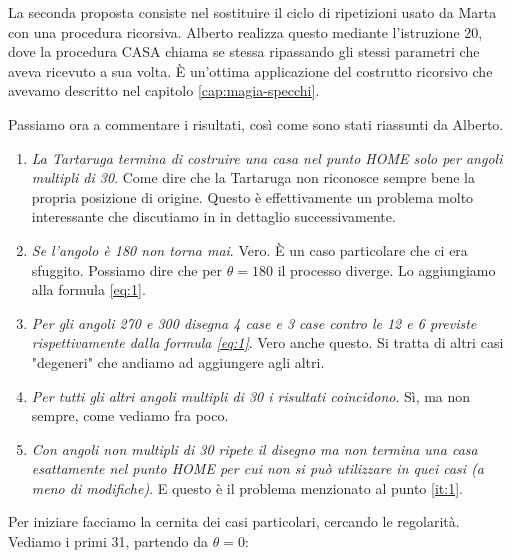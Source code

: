 La seconda proposta consiste nel sostituire il ciclo di ripetizioni usato da
Marta con una procedura ricorsiva. Alberto realizza questo mediante
l'istruzione 20, dove la procedura CASA chiama se stessa ripassando gli stessi
parametri che aveva ricevuto a sua volta. È un'ottima applicazione del
costrutto ricorsivo che avevamo descritto nel capitolo \ref{cap:magia-specchi}.

Passiamo ora a commentare i risultati, così come sono stati riassunti da Alberto.

\begin{enumerate}
	\item \label{it:1} \textit{La Tartaruga termina di costruire una casa nel punto HOME solo
		per angoli multipli di 30}. Come dire che la Tartaruga non
		riconosce sempre bene la propria posizione di origine. Questo
		è effettivamente un problema molto interessante che discutiamo
		in in dettaglio successivamente.
	\item \textit{Se l’angolo è 180 non torna mai}. Vero. È un caso particolare che
		ci era sfuggito. Possiamo dire che per $\theta=180$ il processo
		diverge. Lo aggiungiamo alla formula \ref{eq:1}.
	\item \textit{Per gli angoli 270 e 300 disegna 4 case e 3 case
		contro le 12 e 6 previste rispettivamente dalla formula
		\ref{eq:1}}. Vero anche questo. Si tratta di altri casi
		"degeneri" che andiamo ad aggiungere agli altri.
	\item \textit{Per tutti gli altri angoli multipli di 30 i risultati coincidono}.
		Sì, ma non sempre, come vediamo fra poco.
	\item \textit{Con angoli non multipli di 30 ripete il disegno ma non termina
		una casa esattamente nel punto HOME per cui non si può
		utilizzare in quei casi (a meno di modifiche)}. E questo è il
		problema menzionato al punto \ref{it:1}.
\end{enumerate}
  
Per iniziare facciamo la cernita dei casi particolari, cercando le regolarità.
Vediamo i primi 31, partendo da $\theta = 0$:

